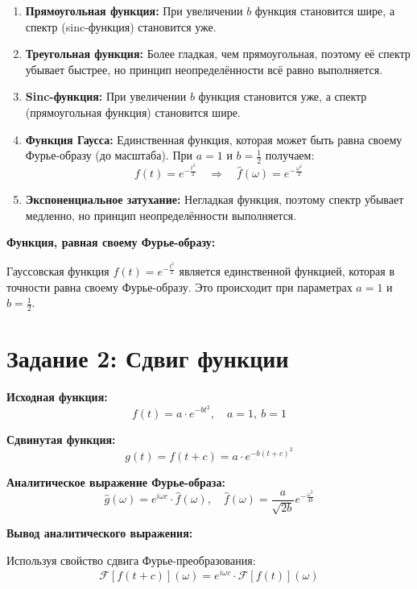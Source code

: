 \begin{enumerate}
    \item \textbf{Прямоугольная функция:} При увеличении $b$ функция становится шире, а спектр (sinc-функция) становится уже.
    
    \item \textbf{Треугольная функция:} Более гладкая, чем прямоугольная, поэтому её спектр убывает быстрее, но принцип неопределённости всё равно выполняется.
    
    \item \textbf{Sinc-функция:} При увеличении $b$ функция становится уже, а спектр (прямоугольная функция) становится шире.
    
    \item \textbf{Функция Гаусса:} Единственная функция, которая может быть равна своему Фурье-образу (до масштаба). При $a = 1$ и $b = \frac{1}{2}$ получаем:
    \[
    f(t) = e^{-\frac{t^2}{2}} \quad \Rightarrow \quad \hat{f}(\omega) = e^{-\frac{\omega^2}{2}}
    \]
    
    \item \textbf{Экспоненциальное затухание:} Негладкая функция, поэтому спектр убывает медленно, но принцип неопределённости выполняется.
\end{enumerate}

\textbf{Функция, равная своему Фурье-образу:}

Гауссовская функция $f(t) = e^{-\frac{t^2}{2}}$ является единственной функцией, которая в точности равна своему Фурье-образу. Это происходит при параметрах $a = 1$ и $b = \frac{1}{2}$.

\section*{Задание 2: Сдвиг функции}

\textbf{Исходная функция:}
\[
f(t) = a \cdot e^{-b t^2}, \quad a = 1, \ b = 1
\]

\textbf{Сдвинутая функция:}
\[
g(t) = f(t + c) = a \cdot e^{-b (t + c)^2}
\]

\textbf{Аналитическое выражение Фурье-образа:}
\[
\hat{g}(\omega) = e^{i \omega c} \cdot \hat{f}(\omega), \quad \hat{f}(\omega) = \frac{a}{\sqrt{2b}} e^{-\frac{\omega^2}{4b}}
\]

\textbf{Вывод аналитического выражения:}

Используя свойство сдвига Фурье-преобразования:
\[
\mathcal{F}[f(t + c)](\omega) = e^{i \omega c} \cdot \mathcal{F}[f(t)](\omega)
\]


